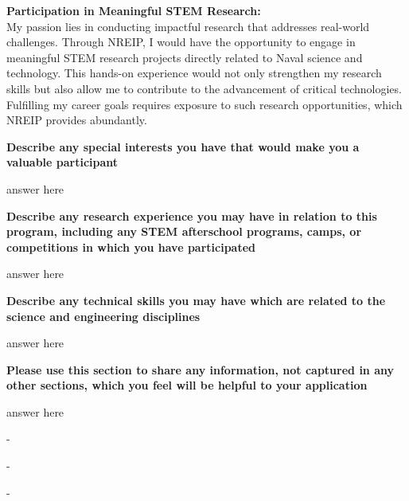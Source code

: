 \documentclass[12pt, letterpaper]{article}
\begin{document}
\noindent \textbf{Participation in Meaningful STEM Research:}
\\


My passion lies in conducting impactful research that addresses real-world challenges. Through NREIP,
I would have the opportunity to engage in meaningful STEM research projects directly related to
Naval science and technology. This hands-on experience would not only strengthen my research skills
but also allow me to contribute to the advancement of critical technologies. Fulfilling my career
goals requires exposure to such research opportunities, which NREIP provides abundantly.


\textbf{Describe any special interests you have that would make you a valuable participant}

answer here

\textbf{Describe any research experience you may have in relation to this program, including any STEM afterschool programs, camps, or competitions in which you have participated}

answer here

\textbf{Describe any technical skills you may have which are related to the science and engineering disciplines}

answer here

\textbf{Please use this section to share any information, not captured in any other sections, which you feel will be helpful to your application}

answer here



    - 

    - 

    - 

\end{document}
